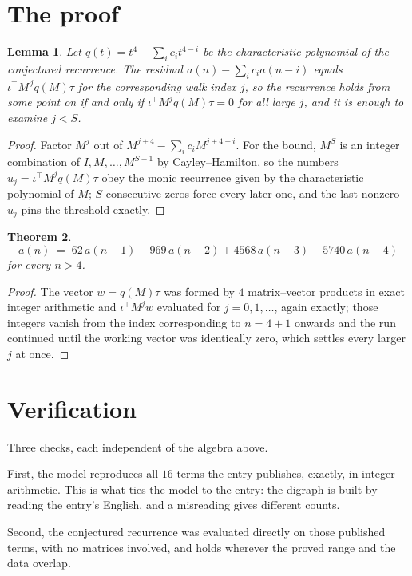 \documentclass[11pt,a4paper]{article}
\theoremstyle{plain}
\newtheorem{theorem}{Theorem}
\newtheorem{lemma}[theorem]{Lemma}
\theoremstyle{definition}
\begin{document}
\section{The proof}

\begin{lemma}\label{lem:crit}
Let $q(t)=t^{4}-\sum_i c_it^{4-i}$ be the characteristic polynomial of the
conjectured recurrence. The residual $a(n)-\sum_ic_ia(n-i)$ equals
$\iota^{\!\top}M^{\,j}q(M)\tau$ for the corresponding walk index $j$, so the recurrence
holds from some point on if and only if $\iota^{\!\top}M^{j}q(M)\tau=0$ for all large $j$,
and it is enough to examine $j<S$.
\end{lemma}

\begin{proof}
Factor $M^{j}$ out of $M^{j+4}-\sum_ic_iM^{j+4-i}$. For the bound, $M^{S}$
is an integer combination of $I,M,\dots,M^{S-1}$ by Cayley--Hamilton, so the numbers
$u_j=\iota^{\!\top}M^{j}q(M)\tau$ obey the monic recurrence given by the characteristic
polynomial of $M$; $S$ consecutive zeros force every later one, and the last nonzero $u_j$
pins the threshold exactly.
\end{proof}

\begin{theorem}
\[
a(n)\;=\;62\,a(n-1) - 969\,a(n-2) + 4568\,a(n-3) - 5740\,a(n-4)
\]
for every $n>4$.
\end{theorem}

\begin{proof}
The vector $w=q(M)\tau$ was formed by $4$ matrix--vector products in exact integer
arithmetic and $\iota^{\!\top}M^{j}w$ evaluated for $j=0,1,\dots$, again exactly; those
integers vanish from the index corresponding to $n=4+1$ onwards and the run continued
until the working vector was identically zero, which settles every larger $j$ at once.
\end{proof}

\section{Verification}

Three checks, each independent of the algebra above.

First, the model reproduces all $16$ terms the entry publishes, exactly, in integer
arithmetic. This is what ties the model to the entry: the digraph is built by reading the
entry's English, and a misreading gives different counts.

Second, the conjectured recurrence was evaluated directly on those published terms, with no
matrices involved, and holds wherever the proved range and the data overlap.
\end{document}
